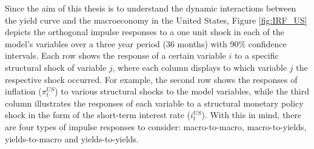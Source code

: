 


Since the aim of this thesis is to understand the dynamic interactions
between the yield curve and the macroeconomy in the United States, Figure \ref{fig:IRF_US} depicts the orthogonal impulse responses to a one unit shock in each of the model's variables over a three year period (36 months) with 90\% confidence intervals. 
Each row shows the response of a certain variable $i$ to a specific structural shock of variable $j$, where each column displays to which variable $j$ the respective shock occurred. 
For example, the second row shows the responses of inflation ($\pi^{US}_{t}$) to various structural shocks to the model variables, while the third column illustrates the responses of each variable to a structural monetary policy shock in the form of the short-term interest rate ($i^{US}_{t}$). 
With this in mind, there are four types of impulse responses to consider: macro-to-macro, macro-to-yields, yields-to-macro and yields-to-yields.  



